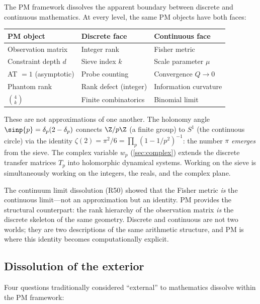 \documentclass[12pt,a4paper]{article}
\begin{document}
The PM framework dissolves the apparent boundary between discrete and
continuous mathematics.  At every level, the same PM objects have both faces:

\begin{center}
\begin{tabular}{lll}
\toprule
\textbf{PM object} & \textbf{Discrete face} & \textbf{Continuous face} \\
\midrule
Observation matrix & Integer rank & Fisher metric \\
Constraint depth $d$ & Sieve index $k$ & Scale parameter $\mu$ \\
AT $= 1$ (asymptotic) & Probe counting & Convergence $Q \to 0$ \\
Phantom rank & Rank defect (integer) & Information curvature \\
$\binom{4}{k}$ & Finite combinatorics & Binomial limit \\
\bottomrule
\end{tabular}
\end{center}

\noindent
These are not approximations of one another.  The holonomy angle
$\sinp{p} = \delta_p(2 - \delta_p)$ connects $\Z/p\Z$ (a finite
group) to $S^1$ (the continuous circle) via the identity
$\zeta(2) = \pi^2/6 = \prod_p (1 - 1/p^2)^{-1}$: the number $\pi$
\emph{emerges} from the sieve.  The complex variable $w_p$
(\cref{sec:complex}) extends the discrete transfer matrices
$T_p$ into holomorphic dynamical systems.  Working on the sieve is
simultaneously working on the integers, the reals, and the complex plane.

\begin{remark}
The continuum limit dissolution (R50) showed that the Fisher metric
\emph{is} the continuous limit---not an approximation but an identity.
PM provides the structural counterpart: the rank hierarchy of the
observation matrix \emph{is} the discrete skeleton of the same geometry.
Discrete and continuous are not two worlds; they are two descriptions
of the same arithmetic structure, and PM is where this identity becomes
computationally explicit.
\end{remark}


\subsection{Dissolution of the exterior}
\label{sec:PM_exterior}

Four questions traditionally considered ``external'' to mathematics
dissolve within the PM framework:
\end{document}
